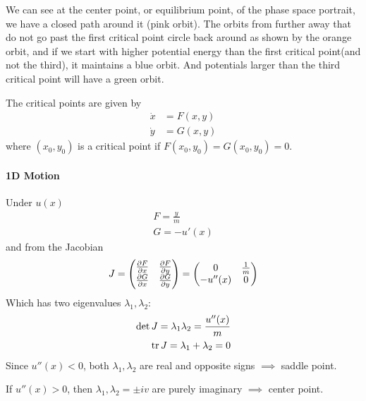 \documentclass[../main.tex]{subfiles}
\begin{document}
We can see at the center point, or equilibrium point, of the phase space portrait, we have a closed
path around it (pink orbit). The orbits from further away that do not go past the first
critical point circle back around as shown by the orange orbit, and if we start with higher
potential energy than the first  critical point(and not the third), it maintains a blue orbit. And
potentials larger than the third critical point will have a green orbit.

The critical points are given by 
\begin{align*}
    \dot x &= F(x,y) \\
    \dot y &= G(x,y)
\end{align*}
where $(x_0, y_0)$ is a critical point if $F(x_0, y_0) = G(x_0, y_0) = 0$.

\paragraph*{1D Motion} Under $u(x)$
\begin{align*}
    F = \frac{y}{m} \\
    G = -u'(x)
\end{align*}
and from the Jacobian
\begin{align*}
    J = \mqty(\pdv{F}{x} & \pdv{F}{y} \\ \pdv{G}{x} & \pdv{G}{y}) = \mqty(0 & \frac{1}{m} \\ -u''(x) & 0)
\end{align*}
Which has two eigenvalues $\lambda_1, \lambda_2$:
\begin{align*}
    \det J = \lambda_1 \lambda_2  = \frac{u''(x)}{m} \\
    \tr J = \lambda_1 + \lambda_2  = 0
\end{align*}
Since $u''(x) < 0$, both $\lambda_1, \lambda_2$ are real and opposite signs $\implies$ saddle point.

If $u''(x) > 0$, then $\lambda_1, \lambda_2 = \pm i v$ are purely imaginary $\implies$ center point.
\end{document}
